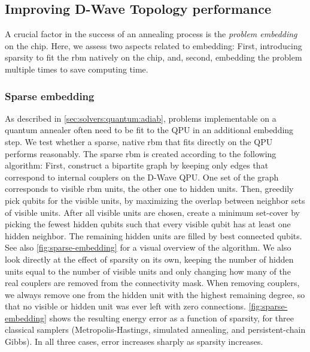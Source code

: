 \documentclass[10pt,a4paper]{article}
\numberwithin{equation}{section}
\begin{document}
\subsection{Improving D-Wave Topology performance}
A crucial factor in the success of an annealing process is the \textit{problem embedding} on the chip. Here, we assess two aspects related to embedding: First, introducing sparsity to fit the \gls{rbm} natively on the chip, and, second, embedding the problem multiple times to save computing time.
\subsubsection{Sparse embedding}
As described in \autoref{sec:solvers:quantum:adiab}, problems implementable on a quantum annealer often need to be fit to the QPU in an additional embedding step. We test whether a sparse, native \gls{rbm} that fits directly on the QPU performs reasonably. The sparse \gls{rbm} is created according to the following algorithm: First, construct a bipartite graph by keeping only edges that correspond to internal couplers on the D-Wave QPU. One set of the graph corresponds to visible \gls{rbm} units, the other one to hidden units. Then, greedily pick qubits for the visible units, by maximizing the overlap between neighbor sets of visible units. After all visible units are chosen, create a minimum set-cover by picking the fewest hidden qubits such that every visible qubit has at least one hidden neighbor. The remaining hidden units are filled by best connected qubits. See also \autoref{fig:sparse-embedding} for a visual overview of the algorithm.
We also look directly at the effect of sparsity on its own, keeping the number of hidden units equal to the number of visible units and only changing how many of the real couplers are removed from the connectivity mask. When removing couplers, we always remove one from the hidden unit with the highest remaining degree, so that no visible or hidden unit was ever left with zero connections. \autoref{fig:sparse-embedding} shows the resulting energy error as a function of sparsity, for three classical samplers (Metropolis-Hastings, simulated annealing, and persistent-chain Gibbs). In all three cases, error increases sharply as sparsity increases.
\end{document}

